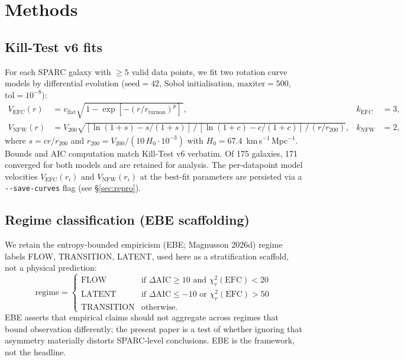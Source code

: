 \documentclass[11pt,a4paper]{article}
\begin{document}
\section{Methods}
\label{sec:methods}

\subsection{Kill-Test v6 fits}

For each SPARC galaxy with $\ge 5$ valid data points, we fit two
rotation curve models by differential evolution
($\text{seed}=42$, Sobol initialisation, $\text{maxiter}=500$,
$\text{tol}=10^{-8}$):
\begin{align}
  V_{\text{EFC}}(r) &= v_{\text{flat}}\sqrt{\,1-\exp[-(r/r_{\text{turnon}})^{p}]\,},
  & k_{\text{EFC}} &= 3, \\
  V_{\text{NFW}}(r) &= V_{200}\sqrt{[\ln(1+s)-s/(1+s)]\,/\,
                        [\ln(1+c)-c/(1+c)]\,/\,(r/r_{200})}, &  k_{\text{NFW}} &= 2,
\end{align}
where $s=cr/r_{200}$ and $r_{200}=V_{200}/(10\,H_0\!\cdot\!10^{-3})$
with $H_0=67.4$~km\,s$^{-1}$\,Mpc$^{-1}$.  Bounds and AIC computation
match Kill-Test v6 verbatim.  Of 175 galaxies, 171 converged for both
models and are retained for analysis.  The per-datapoint model
velocities $V_{\text{EFC}}(r_i)$ and $V_{\text{NFW}}(r_i)$ at the
best-fit parameters are persisted via a \texttt{-{}-save-curves} flag
(see \S\ref{sec:repro}).

\subsection{Regime classification (EBE scaffolding)}

We retain the entropy-bounded empiricism (EBE; Magnusson 2026d) regime
labels FLOW, TRANSITION, LATENT, used here as a stratification scaffold,
not a physical prediction:
\begin{equation}
  \text{regime} =
  \begin{cases}
    \text{FLOW} & \text{if } \Delta\text{AIC}\ge 10 \text{ and } \chi^2_r({\text{EFC}}) < 20 \\
    \text{LATENT} & \text{if } \Delta\text{AIC}\le -10 \text{ or } \chi^2_r({\text{EFC}}) > 50 \\
    \text{TRANSITION} & \text{otherwise.}
  \end{cases}
\end{equation}
EBE asserts that empirical claims should not aggregate across regimes
that bound observation differently; the present paper is a test of
whether ignoring that asymmetry materially distorts SPARC-level
conclusions.  EBE is the framework, not the headline.
\end{document}
